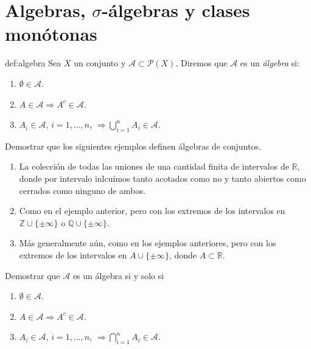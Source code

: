 \section{Algebras, $\sigma$-álgebras y clases monótonas}

\begin{definicion}{def:algebra} 
 Sea $X$ un conjunto y $\mathscr{A}\subset \mathcal{P}(X)$. Diremos que $\mathscr{A}$ es un \emph{álgebra} si:
 \begin{enumerate}
  \item $\emptyset\in\mathscr{A}$.
  \item $A\in\mathscr{A}\Rightarrow A^c\in\mathscr{A}$.
  \item $A_i\in\mathscr{A}$, $i=1,\ldots,n$, $\Rightarrow\bigcup\limits_{i=1}^n A_i\in\mathscr{A}$.
 \end{enumerate}

\end{definicion}


\begin{ejercicio}{} Demostrar que los siguientes ejemplos definen álgebras de conjuntos.
 \begin{enumerate}
  \item La colección de todas las uniones de una cantidad finita de intervalos de $\mathbb{R}$, donde por intervalo inlcuímos tanto acotados como  no y tanto abiertos como cerrados como ninguno de ambos.
  \item Como en el ejemplo anterior, pero con los extremos de los intervalos en $\mathbb{Z}\cup \{\pm \infty\}$ o $\mathbb{Q}\cup \{\pm \infty\}$.
    \item Más generalmente aún, como en los ejemplos anteriores, pero con los extremos de los intervalos en $A\cup \{\pm \infty\}$, donde $A\subset\mathbb{R}$.
 \end{enumerate}
\end{ejercicio}
 \begin{ejercicio}{} Demostrar que $\mathscr{A}$  es un álgebra si y solo si
 \begin{enumerate}
  \item $\emptyset\in\mathscr{A}$.
  \item $A\in\mathscr{A}\Rightarrow A^c\in\mathscr{A}$.
  \item $A_i\in\mathscr{A}$, $i=1,\ldots,n$, $\Rightarrow\bigcap\limits_{i=1}^nA_i\in\mathscr{A}$.
 \end{enumerate}
\end{ejercicio}

